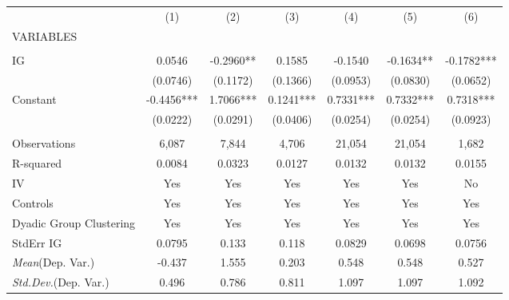 \documentclass[]{article}
\begin{document}
\begin{tabular}{lcccccc} \hline
 & (1) & (2) & (3) & (4) & (5) & (6) \\
VARIABLES &  &  &  &  &  &  \\ \hline
 &  &  &  &  &  &  \\
IG & 0.0546 & -0.2960** & 0.1585 & -0.1540 & -0.1634** & -0.1782*** \\
 & (0.0746) & (0.1172) & (0.1366) & (0.0953) & (0.0830) & (0.0652) \\
Constant & -0.4456*** & 1.7066*** & 0.1241*** & 0.7331*** & 0.7332*** & 0.7318*** \\
 & (0.0222) & (0.0291) & (0.0406) & (0.0254) & (0.0254) & (0.0923) \\
 &  &  &  &  &  &  \\
Observations & 6,087 & 7,844 & 4,706 & 21,054 & 21,054 & 1,682 \\
R-squared & 0.0084 & 0.0323 & 0.0127 & 0.0132 & 0.0132 & 0.0155 \\
IV & Yes & Yes & Yes & Yes & Yes & No \\
Controls & Yes & Yes & Yes & Yes & Yes & Yes \\
Dyadic Group Clustering & Yes & Yes & Yes & Yes & Yes & Yes \\
StdErr IG & 0.0795 & 0.133 & 0.118 & 0.0829 & 0.0698 & 0.0756 \\
\textit{Mean}(Dep. Var.) & -0.437 & 1.555 & 0.203 & 0.548 & 0.548 & 0.527 \\
 \textit{Std.Dev.}(Dep. Var.) & 0.496 & 0.786 & 0.811 & 1.097 & 1.097 & 1.092 \\ \hline
\end{tabular}
\end{document}
